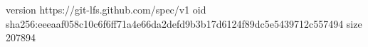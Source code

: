 version https://git-lfs.github.com/spec/v1
oid sha256:eeeaaf058c10c6f6ff71a4e66da2defd9b3b17d6124f89dc5e5439712c557494
size 207894
